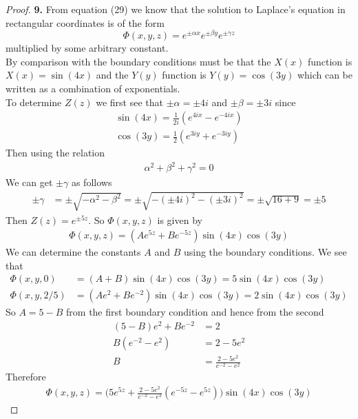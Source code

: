 \documentclass[11pt]{article}
\theoremstyle{definition}
\begin{document}
\cleardoublepage
\begin{proof}{\textbf{9.}}
    From equation (29) we know that the solution to Laplace's equation in
    rectangular coordinates is of the form 
    $$\Phi(x,y,z) = e^{\pm\alpha x}e^{\pm\beta y}e^{\pm\gamma z}$$
    multiplied by some arbitrary constant.\\
    By comparison with the boundary conditions must be that the $X(x)$ function
    is $X(x) = \sin(4x)$ and the $Y(y)$ function is $Y(y) = \cos(3y)$
    which can be written as a combination of exponentials.\\
    To determine $Z(z)$ we first see that $\pm\alpha = \pm 4i$ and
    $\pm\beta = \pm 3i$ since
    \begin{align*}
        \sin(4x) = \frac{1}{2i}(e^{4ix} - e^{-4ix})\\
        \cos(3y) = \frac{1}{2}(e^{3iy} + e^{-3iy})
    \end{align*}
    Then using the relation
    \begin{align*}
        \alpha^2 + \beta^2 + \gamma^2 = 0
    \end{align*}
    We can get $\pm\gamma$ as follows
    \begin{align*}
        \pm\gamma &= \pm\sqrt{-\alpha^2 - \beta^2}
        = \pm\sqrt{-(\pm 4i)^2 - (\pm 3i)^2}
        = \pm\sqrt{16 + 9} = \pm 5
    \end{align*}
    Then $Z(z) = e^{\pm5z}$. So $\Phi(x,y,z)$ is given by
    \begin{align*}
        \Phi(x,y,z) = (Ae^{5z} + Be^{-5z}) \sin(4x)\cos(3y)
    \end{align*}
    We can determine the constants $A$ and $B$ using the boundary conditions.
    We see that
    \begin{align*}
        \Phi(x,y,0) &= (A + B)\sin(4x)\cos(3y) = 5\sin(4x)\cos(3y)\\
        \Phi(x,y,2/5) &= (Ae^2 + Be^{-2})\sin(4x)\cos(3y) = 2\sin(4x)\cos(3y)
    \end{align*}
    So $A = 5 - B$ from the first boundary condition and hence from the second
    \begin{align*}
        (5-B)e^2 + Be^{-2} &= 2\\
        B (e^{-2} - e^2) &= 2 - 5e^2\\
        B &= \frac{2 - 5e^2}{e^{-2} - e^2}
    \end{align*}
    Therefore
    \begin{align*}
        \Phi(x,y,z)
        = \bigg(5e^{5z} + \frac{2 - 5e^2}{e^{-2} - e^2}(e^{-5z}- e^{5z})\bigg)
        \sin(4x)\cos(3y)
    \end{align*}
\end{proof}
\end{document}
